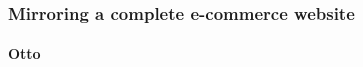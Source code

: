 








\subsubsection{Mirroring a complete e-commerce website}

















\paragraph{Otto}






